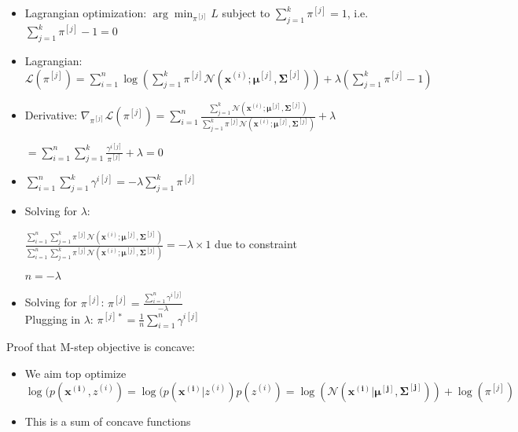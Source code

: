 \begin{itemize}
    \item \With Lagrangian optimization:
    $
    \arg\min_{\pi^{[j]}} L
    $ subject to $\sum_{j=1}^k \pi^{[j]} = 1$, i.e. $\sum_{j=1}^k \pi^{[j]} -1 = 0$

    \item Lagrangian: $
    \mathcal{L}(\pi^{[j]}) = \sum_{i=1}^n \log \left( \sum_{j=1}^k \pi^{[j]} \mathcal{N}\left( \boldsymbol{x}^{(i)}; \boldsymbol{\mu}^{[j]}, \boldsymbol{\Sigma}^{[j]} \right) \right) + \lambda \left( \sum_{j=1}^k \pi^{[j]} - 1 \right)
    $

    \item Derivative:
    $
    \nabla_{\pi^{[j]}} \mathcal{L}(\pi^{[j]}) = \sum_{i=1}^n \frac{\sum_{j=1}^k \mathcal{N}\left( \boldsymbol{x}^{(i)}; \boldsymbol{\mu}^{[j]}, \boldsymbol{\Sigma}^{[j]} \right)}{\sum_{j=1}^k \pi^{[j]} \mathcal{N}\left( \boldsymbol{x}^{(i)}; \boldsymbol{\mu}^{[j]}, \boldsymbol{\Sigma}^{[j]} \right)} + \lambda
    $

    $
    = \sum_{i=1}^n \sum_{j=1}^k \frac{\gamma^{i[j]}}{\pi^{[j]}} + \lambda = 0
    $

    \item $
    \sum_{i=1}^n \sum_{j=1}^k \gamma^{i[j]} = -\lambda \sum_{j=1}^k \pi^{[j]}
    $

    \item Solving for $\lambda$:

    $
    \frac{\sum_{i=1}^n \sum_{j=1}^k \pi^{[j]} \mathcal{N}\left( \boldsymbol{x}^{(i)}; \boldsymbol{\mu}^{[j]}, \boldsymbol{\Sigma}^{[j]} \right)}{\sum_{i=1}^n \sum_{j=1}^k \pi^{[j]} \mathcal{N}\left( \boldsymbol{x}^{(i)}; \boldsymbol{\mu}^{[j]}, \boldsymbol{\Sigma}^{[j]} \right)} = -\lambda \times 1
    $ due to constraint

    $
    n = -\lambda
    $

    \item Solving for $\pi^{[j]}$:
    $
    \pi^{[j]} = \frac{\sum_{i=1}^n \gamma^{i[j]}}{-\lambda}
    $\\
    Plugging in $\lambda$:
    $
    \pi^{[j]*} = \frac{1}{n} \sum_{i=1}^n \gamma^{i[j]}
    $
\end{itemize}
Proof that M-step objective is concave:
\begin{itemize}
    \item We aim top optimize $\log( p(\boldsymbol{x^{(i)}}, z^{(i)}) = \log( p(\boldsymbol{x^{(i)}} | z^{(i)})p(z^{(i)}) = \log(\mathcal{N}(\boldsymbol{x^{(i)}} | \boldsymbol{\mu^{[j]}}, \boldsymbol{\Sigma^{[j]}})) + \log(\pi^{[j]})$
    \item This is a sum of concave functions
\end{itemize}

